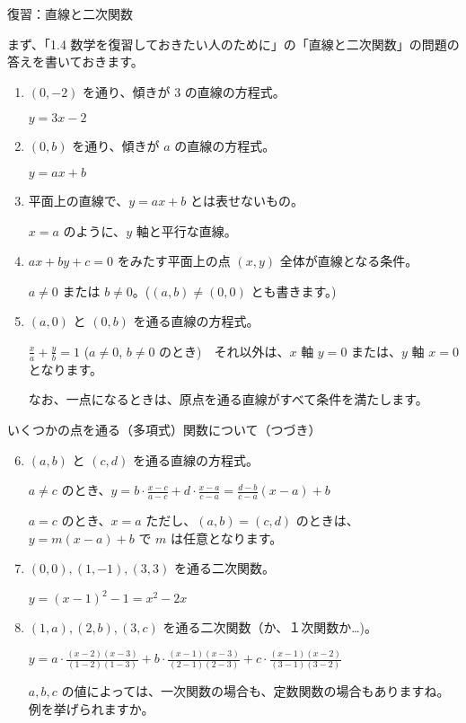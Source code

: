 \documentclass[10pt, dvipdfmx]{beamer}
\begin{document}
\begin{frame}{復習：直線と二次関数}

まず、「1.4 数学を復習しておきたい人のために」の「直線と二次関数」の問題の答えを書いておきます。

\begin{enumerate}
\item \((0,-2)\) を通り、傾きが 3 の直線の方程式。\par
 \(y = 3x-2\)
\item \((0,b)\) を通り、傾きが \(a\) の直線の方程式。\par
 \(y = ax+b\)
\item 平面上の直線で、\(y = ax+b\) とは表せないもの。\par
\(x = a\) のように、\(y\) 軸と平行な直線。
\item \(ax + by + c = 0\) をみたす平面上の点 \((x,y)\) 全体が直線となる条件。\par
 \(a\neq 0\) または \(b\neq 0\)。(\((a,b)\neq (0,0)\) とも書きます。)\par
\item \((a,0)\) と \((0,b)\) を通る直線の方程式。\par
 \({\displaystyle \frac{x}{a} + \frac{y}{b} = 1}\) (\(a\neq 0\), \(b\neq 0\) のとき)　それ以外は、\(x\) 軸 \(y=0\) または、\(y\) 軸 \(x=0\) となります。\par
なお、一点になるときは、原点を通る直線がすべて条件を満たします。
\end{enumerate}
\end{frame}
\begin{frame}{いくつかの点を通る（多項式）関数について（つづき）}
\begin{enumerate}
\setcounter{enumi}{5}
\item \((a,b)\) と \((c,d)\) を通る直線の方程式。\par
 \(a\neq c\) のとき、\({\displaystyle y = b\cdot \frac{x-c}{a-c} + d\cdot \frac{x-a}{c-a} = \frac{d-b}{c-a}(x-a) + b}\)\par
 \(a = c\) のとき、\(x=a\) ただし、\((a,b) = (c,d)\) のときは、\(y = m(x-a) + b\) で \(m\) は任意となります。
\item \((0,0), (1,-1), (3,3)\) を通る二次関数。\par
 \(y = (x-1)^2 -1 = x^2 -2x\)
\item \((1,a), (2,b), (3,c)\) を通る二次関数（か、１次関数か…)。\par
\({\displaystyle y = a\cdot \frac{(x-2)(x-3)}{(1-2)(1-3)} + b\cdot\frac{(x-1)(x-3)}{(2-1)(2-3)} + c\cdot\frac{(x-1)(x-2)}{(3-1)(3-2)}}\)\par
 \(a, b, c\) の値によっては、一次関数の場合も、定数関数の場合もありますね。例を挙げられますか。
\end{enumerate}
\end{frame}
\end{document}
